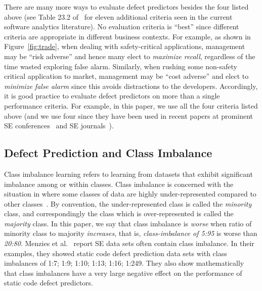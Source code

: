 \documentclass[10pt,conference]{IEEEtran}
\theoremstyle{break}
\theoremstyle{break}
\begin{document}
There are many more ways to evaluate defect predictors besides the four listed above
(see Table 23.2 of~\cite{menzies2014sharing} for   eleven additional
criteria seen in the current software analytics literature).
No evaluation criteria is ``best'' since different  criteria are appropriate in different business contexts. For example, as shown
in 
Figure~\ref{fig:trade},
when dealing
with safety-critical applications, management may be
``risk adverse'' and hence many elect
 to {\em maximize recall}, regardless of the time wasted exploring  false alarm.
 Similarly, 
when rushing some non-safety critical application to market, management may be ``cost adverse''
and elect to {\em minimize false alarm} since this avoids distractions to the developers. 
 Accordingly, it is good practice to evaluate defect predictors on more than a single performance criteria. For example, in this paper,
we use all the four   criteria listed above
(and we use four since they have
been used in recent papers  
at prominent SE conferences~\cite{ghotra2015revisiting} and SE journals~\cite{fu2016tuning}).
 

\subsection{Defect Prediction and Class Imbalance}
\label{sect:imbalance}

Class imbalance learning refers to learning from datasets that exhibit significant imbalance among or within classes. Class imbalance  is concerned with the situation in where some classes of data are
highly under-represented compared to other classes~\cite{he2009learning}.
By convention,
the under-represented class is called the {\em minority} class,
and correspondingly the class which is over-represented is called the
{\em majority} class. In this paper, we say that class imbalance is {\em worse}
when ratio of minority class to majority {\em increases}, that is,
{\em class-imbalance of 5:95} is worse than {\em 20:80}. Menzies et al.~\cite{menzies2007problems} report SE data sets often contain class imbalance. In their examples, they showed static code defect prediction data sets with
class imbalances of 1:7; 1:9; 1:10; 1:13; 1:16; 1:249.
They also show mathematically that  class imbalances  have a very large  negative effect on the performance of static code defect predictors.  
\end{document}
